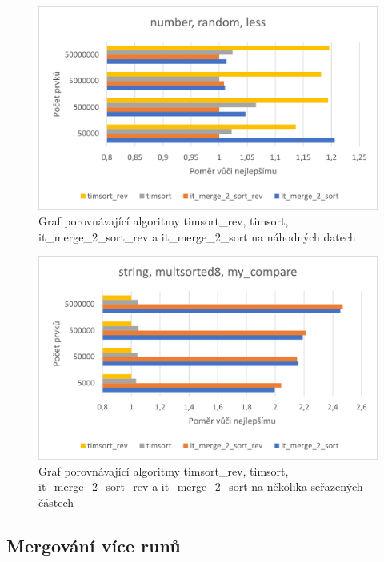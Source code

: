 \documentclass[thesis=B,czech]{FITthesis}[2019/12/23]
\begin{document}
\begin{figure}[htbp]\centering
	\includegraphics{obrazky/graf15.png}
	\caption[Graf porovnávající algoritmy timsort\_rev, timsort,\linebreak it\_merge\_2\_sort\_rev a it\_merge\_2\_sort na náhodných datech]{Graf porovnávající algoritmy timsort\_rev, timsort, it\_merge\_2\_sort\_rev a it\_merge\_2\_sort na náhodných datech}\label{fig:graf15}
\end{figure}

\begin{figure}[htbp]\centering
	\includegraphics{obrazky/graf16.png}
	\caption[Graf porovnávající algoritmy timsort\_rev, timsort,\linebreak it\_merge\_2\_sort\_rev a it\_merge\_2\_sort na několika seřazených částech]{Graf porovnávající algoritmy timsort\_rev, timsort, it\_merge\_2\_sort\_rev a it\_merge\_2\_sort na několika seřazených částech}\label{fig:graf16}
\end{figure}

\subsection{Mergování více runů}
\end{document}
